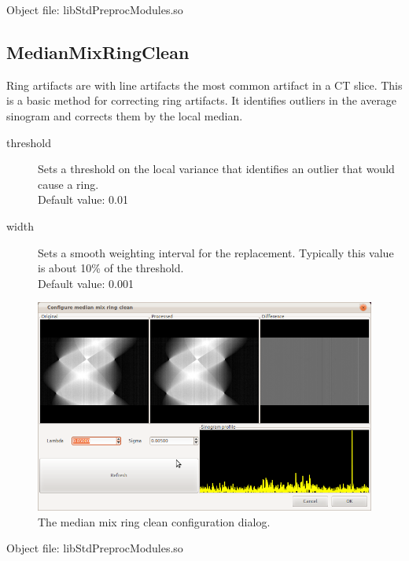 \documentclass[a4paper]{scrreprt}
\begin{document}
Object file: libStdPreprocModules.so

\subsection{MedianMixRingClean}
Ring artifacts are with line artifacts the most common artifact in a CT slice. This is a basic method for correcting ring artifacts. It identifies outliers in the average sinogram and corrects them by the local median.
\begin{description}
 \item[threshold] Sets a threshold on the local variance that identifies an outlier that would cause a ring. \\ Default value: 0.01
\item[width] Sets a smooth weighting interval for the replacement. Typically this value is about 10\% of the threshold. \\ Default value: 0.001
\end{description}
\begin{figure}[ht!]
\centering
\includegraphics[scale=0.5]{figures/ConfMedMixRing.png}
\caption{The median mix ring clean configuration dialog.}
\end{figure}

Object file: libStdPreprocModules.so
\end{document}
